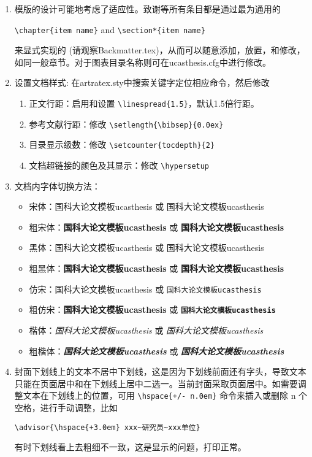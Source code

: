 \begin{enumerate}
    \item 模版的设计可能地考虑了适应性。致谢等所有条目都是通过最为通用的

        \verb+\chapter{item name}+  and \verb+\section*{item name}+

        来显式实现的 (请观察Backmatter.tex)，从而可以随意添加，放置，和修改，如同一般章节。对于图表目录名称则可在ucasthesis.cfg中进行修改。

    \item 设置文档样式: 在artratex.sty中搜索关键字定位相应命令，然后修改
        \begin{enumerate}
            \item 正文行距：启用和设置 \verb|\linespread{1.5}|，默认1.5倍行距。
            \item 参考文献行距：修改 \verb|\setlength{\bibsep}{0.0ex}|
            \item 目录显示级数：修改 \verb|\setcounter{tocdepth}{2}|
            \item 文档超链接的颜色及其显示：修改 \verb|\hypersetup|
        \end{enumerate}

    \item 文档内字体切换方法：
        \begin{itemize}
            \item 宋体：国科大论文模板ucasthesis 或 \textrm{国科大论文模板ucasthesis}
            \item 粗宋体：{\bfseries 国科大论文模板ucasthesis} 或 \textbf{国科大论文模板ucasthesis}
            \item 黑体：{\sffamily 国科大论文模板ucasthesis} 或 \textsf{国科大论文模板ucasthesis}
            \item 粗黑体：{\bfseries\sffamily 国科大论文模板ucasthesis} 或 \textsf{\bfseries 国科大论文模板ucasthesis}
            \item 仿宋：{\ttfamily 国科大论文模板ucasthesis} 或 \texttt{国科大论文模板ucasthesis}
            \item 粗仿宋：{\bfseries\ttfamily 国科大论文模板ucasthesis} 或 \texttt{\bfseries 国科大论文模板ucasthesis}
            \item 楷体：{\itshape 国科大论文模板ucasthesis} 或 \textit{国科大论文模板ucasthesis}
            \item 粗楷体：{\bfseries\itshape 国科大论文模板ucasthesis} 或 \textit{\bfseries 国科大论文模板ucasthesis}
        \end{itemize}

    \item 封面下划线上的文本不居中下划线，这是因为下划线前面还有字头，导致文本只能在页面居中和在下划线上居中二选一。当前封面采取页面居中。如需要调整文本在下划线上的位置，可用 \verb|\hspace{+/- n.0em}| 命令来插入或删除 n 个空格，进行手动调整，比如

        \verb|\advisor{\hspace{+3.0em} xxx~研究员~xxx单位}|

    有时下划线看上去粗细不一致，这是显示的问题，打印正常。
\end{enumerate}
